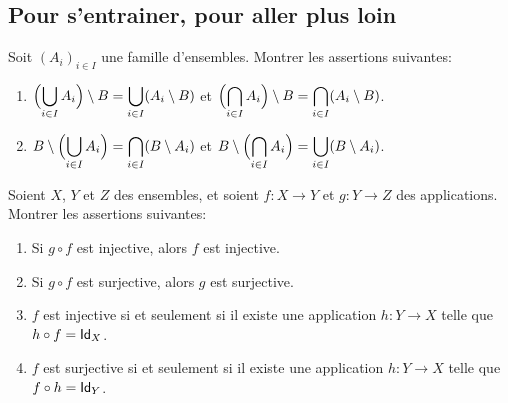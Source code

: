 %
\subsection*{Pour s'entrainer, pour aller plus loin}
%

%
\begin{td-exo}
    Soit \({(A_i)}_{i\in I}\) une famille d'ensembles. Montrer les assertions suivantes:
    \begin{enumerate}
        \item \(\displaystyle \Bigl(\bigcup_{i\in I}A_i\Bigr)\setminus B
        = \bigcup_{i\in I}(A_i\setminus B)\) et
        \(\displaystyle \Bigl(\bigcap_{i\in I}A_i\Bigr)\setminus B
        = \bigcap_{i\in I}(A_i\setminus B)\).
        \item \(\displaystyle B\setminus \Bigl(\bigcup_{i\in I}A_i\Bigr)
        = \bigcap_{i\in I}(B\setminus A_i)\) et
        \(\displaystyle B\setminus \Bigl(\bigcap_{i\in I}A_i\Bigr)
        = \bigcup_{i\in I}(B\setminus A_i)\).
    \end{enumerate}
\end{td-exo}


%
    \begin{td-exo}
    Soient \(X\), \(Y\) et \(Z\) des ensembles, et soient \(f:X\to Y\) et \(g:Y\to Z\) des applications. Montrer les assertions suivantes:
    \begin{enumerate}
        \item Si \(g\circ f\) est injective, alors \(f\) est injective.
        \item Si \(g\circ f\) est surjective, alors \(g\) est surjective.
        \item \(f\) est injective si et seulement si il existe une application \(h:Y\to X\) telle que \(h\circ f=\operatorname{\mathsf{Id}}_X\).
        \item \(f\) est surjective si et seulement si il existe une application \(h:Y\to X\) telle que \(f\circ h=\operatorname{\mathsf{Id}}_Y\).
    \end{enumerate}
\end{td-exo}


